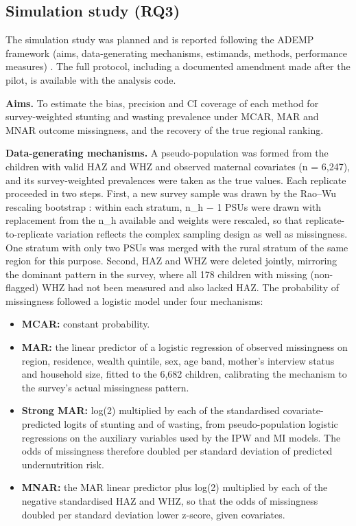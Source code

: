 \documentclass[11pt,a4paper]{article}
\providecommand{\tightlist}{\setlength{\itemsep}{0pt}\setlength{\parskip}{0pt}}
\begin{document}
\subsection{Simulation study (RQ3)}\label{simulation-study-rq3}

The simulation study was planned and is reported following the ADEMP
framework (aims, data-generating mechanisms, estimands, methods,
performance measures) \cite{morris2019using}. The full protocol,
including a documented amendment made after the pilot, is available with
the analysis code.

\textbf{Aims.} To estimate the bias, precision and CI coverage of each
method for survey-weighted stunting and wasting prevalence under MCAR,
MAR and MNAR outcome missingness, and the recovery of the true regional
ranking.

\textbf{Data-generating mechanisms.} A pseudo-population was formed from
the children with valid HAZ and WHZ and observed maternal covariates (n
= 6,247), and its survey-weighted prevalences were taken as the true
values. Each replicate proceeded in two steps. First, a new survey
sample was drawn by the Rao--Wu rescaling bootstrap
\cite{rao1988resampling}: within each stratum, n\_h $-$ 1 PSUs were drawn
with replacement from the n\_h available and weights were rescaled, so
that replicate-to-replicate variation reflects the complex sampling
design as well as missingness. One stratum with only two PSUs was merged
with the rural stratum of the same region for this purpose. Second, HAZ
and WHZ were deleted jointly, mirroring the dominant pattern in the
survey, where all 178 children with missing (non-flagged) WHZ had not
been measured and also lacked HAZ. The probability of missingness
followed a logistic model under four mechanisms:

\begin{itemize}
\tightlist
\item
  \textbf{MCAR:} constant probability.
\item
  \textbf{MAR:} the linear predictor of a logistic regression of
  observed missingness on region, residence, wealth quintile, sex, age
  band, mother's interview status and household size, fitted to the
  6,682 children, calibrating the mechanism to the survey's actual
  missingness pattern.
\item
  \textbf{Strong MAR:} log(2) multiplied by each of the standardised
  covariate-predicted logits of stunting and of wasting, from
  pseudo-population logistic regressions on the auxiliary variables used
  by the IPW and MI models. The odds of missingness therefore doubled
  per standard deviation of predicted undernutrition risk.
\item
  \textbf{MNAR:} the MAR linear predictor plus log(2) multiplied by each
  of the negative standardised HAZ and WHZ, so that the odds of
  missingness doubled per standard deviation lower z-score, given
  covariates.
\end{itemize}
\end{document}

